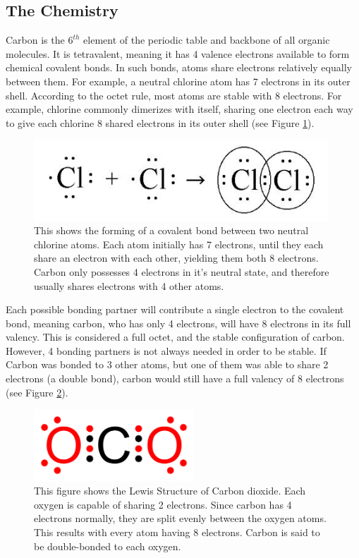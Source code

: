 \documentclass[12pt]{article}
\begin{document}
\subsection{The Chemistry}

Carbon is the $6^{th}$ element of the periodic table and backbone of all organic molecules. It is tetravalent, meaning it has 4 valence electrons available to form chemical covalent bonds. In such bonds, atoms share electrons relatively equally between them. For example, a neutral chlorine atom has 7 electrons in its outer shell. According to the octet rule, most atoms are stable with 8 electrons. For example, chlorine commonly dimerizes with itself, sharing one electron each way to give each chlorine 8 shared electrons in its outer shell (see Figure \ref{fig:chlorine}).

\begin{figure}[ht!]
\centering
\includegraphics[width=110mm]{chlorine.jpg}
\caption{This shows the forming of a covalent bond between two neutral chlorine atoms. Each atom initially has 7 electrons, until they each share an electron with each other, yielding them both 8 electrons. Carbon only possesses 4 electrons in it's neutral state, and therefore usually shares electrons with 4 other atoms.}
\label{fig:chlorine}
\end{figure}

Each possible bonding partner will contribute a single electron to the covalent bond, meaning carbon, who has only 4 electrons, will have 8 electrons in its full valency. This is considered a full octet, and the stable configuration of carbon. However, 4 bonding partners is not always needed in order to be stable. If Carbon was bonded to 3 other atoms, but one of them was able to share 2 electrons (a double bond), carbon would still have a full valency of 8 electrons (see Figure \ref{fig:C02}).

\begin{figure}[ht!]
\centering
\includegraphics[width=60mm]{c02.jpg}
\caption{This figure shows the Lewis Structure of Carbon dioxide. Each oxygen is capable of sharing 2 electrons. Since carbon has 4 electrons normally, they are split evenly between the oxygen atoms. This results with every atom having 8 electrons. Carbon is said to be double-bonded to each oxygen.}
\label{fig:C02}
\end{figure}
\end{document}
